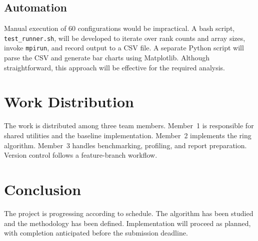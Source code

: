 \documentclass[12pt,a4paper]{article}
\begin{document}
\subsection{Automation}

Manual execution of 60 configurations would be impractical. A bash script, \texttt{test\_runner.sh}, will be developed to iterate over rank counts and array sizes, invoke \texttt{mpirun}, and record output to a CSV file. A separate Python script will parse the CSV and generate bar charts using Matplotlib. Although straightforward, this approach will be effective for the required analysis.

\section{Work Distribution}

The work is distributed among three team members. Member~1 is responsible for shared utilities and the baseline implementation. Member~2 implements the ring algorithm. Member~3 handles benchmarking, profiling, and report preparation. Version control follows a feature-branch workflow.

\section{Conclusion}

The project is progressing according to schedule. The algorithm has been studied and the methodology has been defined. Implementation will proceed as planned, with completion anticipated before the submission deadline.
\end{document}

